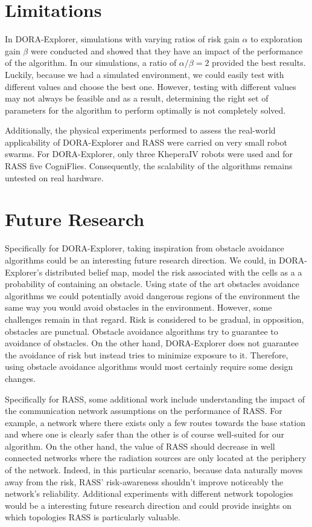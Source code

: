 \section{Limitations}\label{sec:Limitations}
In DORA-Explorer, simulations with varying ratios of risk gain $\alpha$ to exploration gain $\beta$ were conducted and showed that they have an impact of the performance of the algorithm. In our simulations, a ratio of $\alpha / \beta = 2$ provided the best results. Luckily, because we had a simulated environment, we could easily test with different values and choose the best one. However, testing with different values may not always be feasible and as a result, determining the right set of parameters for the algorithm to perform optimally is not completely solved.

Additionally, the physical experiments performed to assess the real-world applicability of DORA-Explorer and RASS were carried on very small robot swarms. For DORA-Explorer, only three KheperaIV robots were used and for RASS five CogniFlies. Consequently, the scalability of the algorithms remains untested on real hardware. 

\section{Future Research}

Specifically for DORA-Explorer, taking inspiration from obstacle avoidance algorithms could be an interesting future research direction. We could, in DORA-Explorer's distributed belief map, model the risk associated with the cells as a a probability of containing an obstacle. Using state of the art obstacles avoidance algorithms we could potentially avoid dangerous regions of the environment the same way you would avoid obstacles in the environment. However, some challenges remain in that regard. Risk is considered to be gradual, in opposition, obstacles are punctual. Obstacle avoidance algorithms try to guarantee to avoidance of obstacles. On the other hand, DORA-Explorer does not guarantee the avoidance of risk but instead tries to minimize exposure to it. Therefore, using obstacle avoidance algorithms would most certainly require some design changes.  

Specifically for RASS, some additional work include understanding the impact of the communication network assumptions on the performance of RASS. For example, a network where there exists only a few routes towards the base station and where one is clearly safer than the other is of course well-suited for our algorithm. On the other hand, the value of RASS should decrease in well connected networks where the radiation sources are only located at the periphery of the network. Indeed, in this particular scenario, because data naturally moves away from the risk, RASS' risk-awareness shouldn't improve noticeably the network's reliability. Additional experiments with different network topologies would be a interesting future research direction and could provide insights on which topologies RASS is particularly valuable.

